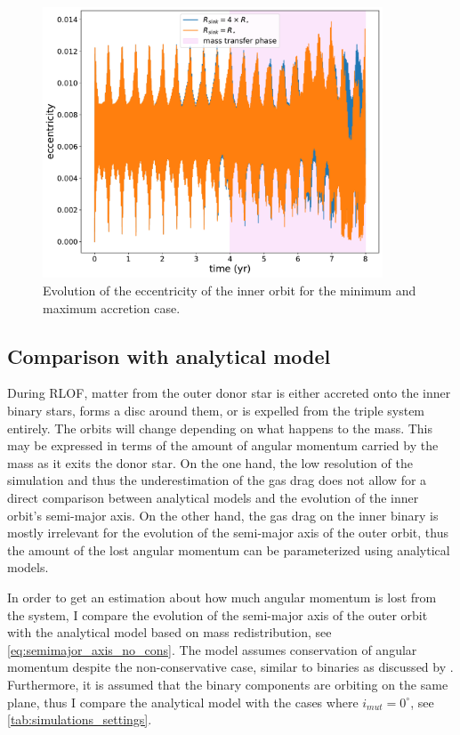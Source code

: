 \begin{figure}[H]
    \centering
    \includegraphics[width=0.9\textwidth]{Thesis/graphs/accretion_case/accretion_inner_ecc.pdf}
    \caption{Evolution of the eccentricity of the inner orbit for the minimum and maximum accretion case.}
    \label{fig:accretion_inner_ecc}
\end{figure}

\subsection{Comparison with analytical model}

During RLOF, matter from the outer donor star is either accreted onto the inner binary stars, forms a disc around them, or is expelled from the triple system entirely. The orbits will change depending on what happens to the mass. This may be expressed in terms of the amount of angular momentum carried by the mass as it exits the donor star. On the one hand, the low resolution of the simulation and thus the underestimation of the gas drag does not allow for a direct comparison between analytical models and the evolution of the inner orbit's semi-major axis. On the other hand, the gas drag on the inner binary is mostly irrelevant for the evolution of the semi-major axis of the outer orbit, thus the amount of the lost angular momentum can be parameterized using analytical models.

In order to get an estimation about how much angular momentum is lost from the system, I compare the evolution of the semi-major axis of the outer orbit with the analytical model based on mass redistribution, see \cref{eq:semimajor_axis_no_cons}. The model assumes conservation of angular momentum despite the non-conservative case, similar to binaries as discussed by \cite{portegies1995formation}. Furthermore, it is assumed that the binary components are orbiting on the same plane, thus I compare the analytical model with the cases where $i_{mut}=0^{\circ}$, see \cref{tab:simulations_settings}.

